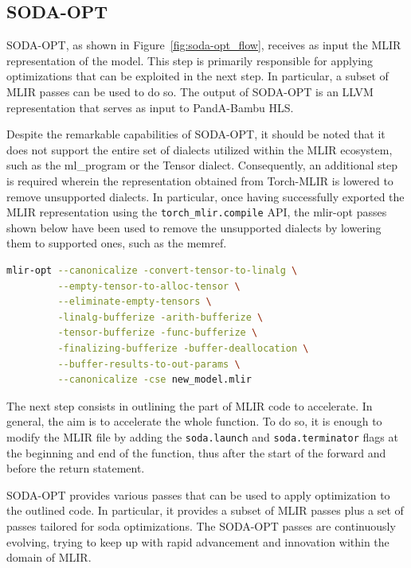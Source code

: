 \subsection{SODA-OPT}
\label{subsec:toolchain-soda_opt}%

SODA-OPT, as shown in Figure~\ref{fig:soda-opt_flow}, receives as input the MLIR representation of the model.
This step is primarily responsible for applying optimizations that can be exploited in the next step.
In particular, a subset of MLIR passes can be used to do so.
The output of SODA-OPT is an LLVM representation that serves as input to PandA-Bambu HLS\@.

Despite the remarkable capabilities of SODA-OPT, it should be noted that it does not support the entire set of dialects utilized within the MLIR ecosystem, such as the ml\_program or the Tensor dialect.
Consequently, an additional step is required wherein the representation obtained from Torch-MLIR is lowered to remove unsupported dialects.
In particular, once having successfully exported the MLIR representation using the \lstinline{torch_mlir.compile} API, the mlir-opt passes shown below have been used to remove the unsupported dialects by lowering them to supported ones, such as the memref.

\begin{lstlisting}[language=bash,label={lst:mlir-opt-remove}]
mlir-opt --canonicalize -convert-tensor-to-linalg \
         --empty-tensor-to-alloc-tensor \
         --eliminate-empty-tensors \
         -linalg-bufferize -arith-bufferize \
         -tensor-bufferize -func-bufferize \
         -finalizing-bufferize -buffer-deallocation \
         --buffer-results-to-out-params \
         --canonicalize -cse new_model.mlir
\end{lstlisting}

The next step consists in outlining the part of MLIR code to accelerate.
In general, the aim is to accelerate the whole function.
To do so, it is enough to modify the MLIR file by adding the \lstinline{soda.launch} and \lstinline{soda.terminator} flags at the beginning and end of the function, thus after the start of the forward and before the return statement.

SODA-OPT provides various passes that can be used to apply optimization to the outlined code.
In particular, it provides a subset of MLIR passes plus a set of passes tailored for soda optimizations.
The SODA-OPT passes are continuously evolving, trying to keep up with rapid advancement and innovation within the domain of MLIR\@.

